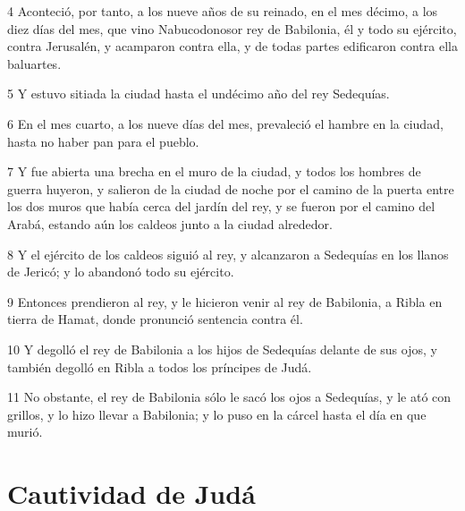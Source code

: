 \par 4 Aconteció, por tanto, a los nueve años de su reinado, en el mes décimo, a los diez días del mes, que vino Nabucodonosor rey de Babilonia, él y todo su ejército, contra Jerusalén, y acamparon contra ella, y de todas partes edificaron contra ella baluartes.
\par 5 Y estuvo sitiada la ciudad hasta el undécimo año del rey Sedequías.
\par 6 En el mes cuarto, a los nueve días del mes, prevaleció el hambre en la ciudad, hasta no haber pan para el pueblo.
\par 7 Y fue abierta una brecha en el muro de la ciudad, y todos los hombres de guerra huyeron, y salieron de la ciudad de noche por el camino de la puerta entre los dos muros que había cerca del jardín del rey, y se fueron por el camino del Arabá, estando aún los caldeos junto a la ciudad alrededor.
\par 8 Y el ejército de los caldeos siguió al rey, y alcanzaron a Sedequías en los llanos de Jericó; y lo abandonó todo su ejército.
\par 9 Entonces prendieron al rey, y le hicieron venir al rey de Babilonia, a Ribla en tierra de Hamat, donde pronunció sentencia contra él.
\par 10 Y degolló el rey de Babilonia a los hijos de Sedequías delante de sus ojos, y también degolló en Ribla a todos los príncipes de Judá.
\par 11 No obstante, el rey de Babilonia sólo le sacó los ojos a Sedequías, y le ató con grillos, y lo hizo llevar a Babilonia; y lo puso en la cárcel hasta el día en que murió.

\section*{Cautividad de Judá}


